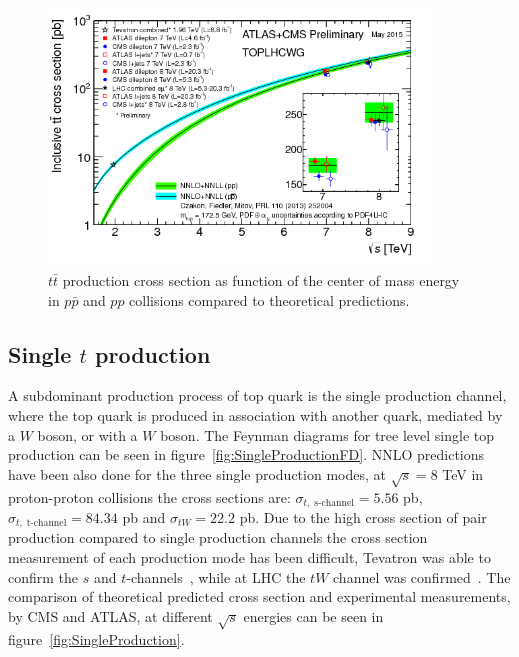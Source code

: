 \begin{figure}[!Hhtbp]
  \begin{center}
    \includegraphics[width=0.9\textwidth]{figs/toplhcwg_ttxsec_sqrts_may2015.png}
    \caption{$t\bar{t}$ production cross section as function of the center of mass energy in $p\bar{p}$ and $pp$ collisions compared to theoretical predictions.}
    \label{fig:PairProduction}
  \end{center}
\end{figure}


\subsection{Single $t$ production}
\label{subsec:topsing}

A subdominant production process of top quark is the single production channel, where the top quark is produced in association with another quark, mediated by a $W$ boson, or with a $W$ boson. The Feynman diagrams for tree level single top production can be seen in figure~\ref{fig:SingleProductionFD}. NNLO predictions have been also done for the three single production modes, at $\sqrt{s}=8$ TeV in proton-proton collisions the cross sections are: $\sigma_{t,\; \text{s-channel}}=5.56$ pb, $\sigma_{t,\; \text{t-channel}}=84.34$ pb and $\sigma_{tW}=22.2$ pb. Due to the high cross section of pair production compared to single production channels the cross section measurement of each production mode has been difficult, Tevatron was able to confirm the $s$ and $t$-channels~\cite{Aaltonen:2009jj}, while at LHC the $tW$ channel was confirmed~\cite{Chatrchyan:1642680}. The comparison of theoretical predicted cross section and experimental measurements, by CMS and ATLAS, at different $\sqrt{s}$ energies can be seen in figure~\ref{fig:SingleProduction}.

